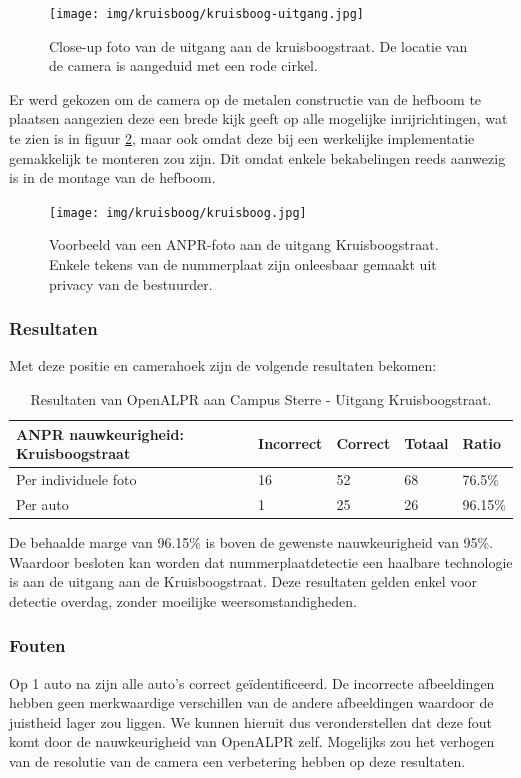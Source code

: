 \begin{figure}[h!]
	\centering
	\texttt{[image: img/kruisboog/kruisboog-uitgang.jpg]}
	\caption{Close-up foto van de uitgang aan de kruisboogstraat. De locatie van de camera is aangeduid met een rode cirkel.}
	\label{fig:Kruisboog-uitgang}
\end{figure}

Er werd gekozen om de camera op de metalen constructie van de hefboom te plaatsen aangezien deze een brede kijk geeft op alle mogelijke inrijrichtingen, wat te zien is in figuur \ref{fig:Kruisboog}, maar ook omdat deze bij een werkelijke implementatie gemakkelijk te monteren zou zijn. Dit omdat enkele bekabelingen reeds aanwezig is in de montage van de hefboom.

\begin{figure}[h!]
	\centering
	\texttt{[image: img/kruisboog/kruisboog.jpg]}
	\caption{Voorbeeld van een ANPR-foto aan de uitgang Kruisboogstraat. Enkele tekens van de nummerplaat zijn onleesbaar gemaakt uit privacy van de bestuurder.}
	\label{fig:Kruisboog}
\end{figure}

\subsubsection{Resultaten}

Met deze positie en camerahoek zijn de volgende resultaten bekomen:

\begin{table}[h!]
	\centering
	\begin{tabular}{l|l|l|l|l}
		\textbf{ANPR nauwkeurigheid: Kruisboogstraat} & Incorrect & Correct & Totaal & Ratio	\\ \hline
		Per individuele foto 	& 16 & 52	& 68	& 76.5\%\\
		Per auto				& 1 & 25	& 26 	& 96.15\%\\
	\end{tabular}
	\caption{Resultaten van OpenALPR aan Campus Sterre - Uitgang Kruisboogstraat.}
	\label{ResultatenKruisboog}
\end{table}

De behaalde marge van 96.15\% is boven de gewenste nauwkeurigheid van 95\%. Waardoor besloten kan worden dat nummerplaatdetectie een haalbare technologie is aan de uitgang aan de Kruisboogstraat. Deze resultaten gelden enkel voor detectie overdag, zonder moeilijke weersomstandigheden.

\subsubsection{Fouten}
Op 1 auto na zijn alle auto's correct geïdentificeerd. De incorrecte afbeeldingen hebben geen merkwaardige verschillen van de andere afbeeldingen waardoor de juistheid lager zou liggen. We kunnen hieruit dus veronderstellen dat deze fout komt door de nauwkeurigheid van OpenALPR zelf. Mogelijks zou het verhogen van de resolutie van de camera een verbetering hebben op deze resultaten.

